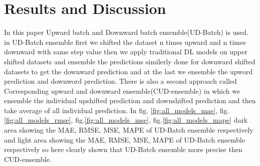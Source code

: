 \documentclass[sn-mathphys,Numbered]{sn-jnl}
\theoremstyle{thmstyleone}
\theoremstyle{thmstyletwo}
\theoremstyle{thmstylethree}
\begin{document}
\section{Results and Discussion}\label{sec2}
In this paper Upward batch and Downward batch ensemble(UD-Batch) is used. in UD-Batch ensemble first we shifted the dataset n times upward and n times downward with same step value then we apply traditional DL models  on upper shifted datasets and ensemble the predictions similerly done for downward shifted datasets  to get the downward prediction and at the last we ensemble the upword  prediction and downword prediction. There is  also a second approach called Corresponding upward and downward ensemble(CUD-ensemble) in which we ensemble the individual upshifted prediction and downshifted prediction  and then take average of all individual prediction. In fig. \ref{fig:all_models_mae}, fig.\ref{fig:all_models_rmse}, fig.\ref{fig:all_models_mse}, fig.\ref{fig:all_models_mape} dark area showing the MAE, RMSE, MSE, MAPE of UD-Batch ensemble  respectively and light area showing the MAE, RMSE, MSE, MAPE of UD-Batch ensemble  respectively so here clearly shown that UD-Batch ensemble more precise then CUD-ensemble.
\end{document}
